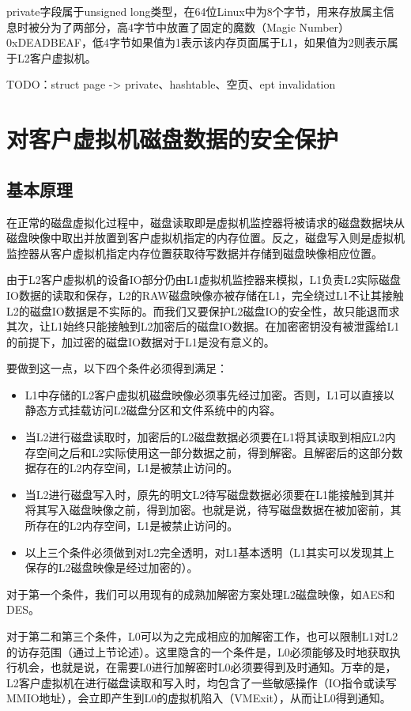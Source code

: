 private字段属于unsigned long类型，在64位Linux中为8个字节，用来存放属主信息时被分为了两部分，高4字节中放置了固定的魔数（Magic Number）0xDEADBEAF，低4字节如果值为1表示该内存页面属于L1，如果值为2则表示属于L2客户虚拟机。

TODO：struct page -> private、hashtable、空页、ept invalidation

\section{对客户虚拟机磁盘数据的安全保护}

\subsection{基本原理}

在正常的磁盘虚拟化过程中，磁盘读取即是虚拟机监控器将被请求的磁盘数据块从磁盘映像中取出并放置到客户虚拟机指定的内存位置。反之，磁盘写入则是虚拟机监控器从客户虚拟机指定内存位置获取待写数据并存储到磁盘映像相应位置。

由于L2客户虚拟机的设备IO部分仍由L1虚拟机监控器来模拟，L1负责L2实际磁盘IO数据的读取和保存，L2的RAW磁盘映像亦被存储在L1，完全绕过L1不让其接触L2的磁盘IO数据是不实际的。而我们又要保护L2磁盘IO的安全性，故只能退而求其次，让L1始终只能接触到L2加密后的磁盘IO数据。在加密密钥没有被泄露给L1的前提下，加过密的磁盘IO数据对于L1是没有意义的。

要做到这一点，以下四个条件必须得到满足：

\begin{itemize}
\item{L1中存储的L2客户虚拟机磁盘映像必须事先经过加密。否则，L1可以直接以静态方式挂载访问L2磁盘分区和文件系统中的内容。}
\item{当L2进行磁盘读取时，加密后的L2磁盘数据必须要在L1将其读取到相应L2内存空间之后和L2实际使用这一部分数据之前，得到解密。且解密后的这部分数据存在的L2内存空间，L1是被禁止访问的。}
\item{当L2进行磁盘写入时，原先的明文L2待写磁盘数据必须要在L1能接触到其并将其写入磁盘映像之前，得到加密。也就是说，待写磁盘数据在被加密前，其所存在的L2内存空间，L1是被禁止访问的。}
\item{以上三个条件必须做到对L2完全透明，对L1基本透明（L1其实可以发现其上保存的L2磁盘映像是经过加密的）。}
\end{itemize}

对于第一个条件，我们可以用现有的成熟加解密方案处理L2磁盘映像，如AES和DES。

对于第二和第三个条件，L0可以为之完成相应的加解密工作，也可以限制L1对L2的访存范围（通过上节论述）。这里隐含的一个条件是，L0必须能够及时地获取执行机会，也就是说，在需要L0进行加解密时L0必须要得到及时通知。万幸的是，L2客户虚拟机在进行磁盘读取和写入时，均包含了一些敏感操作（IO指令或读写MMIO地址），会立即产生到L0的虚拟机陷入（VMExit），从而让L0得到通知。

